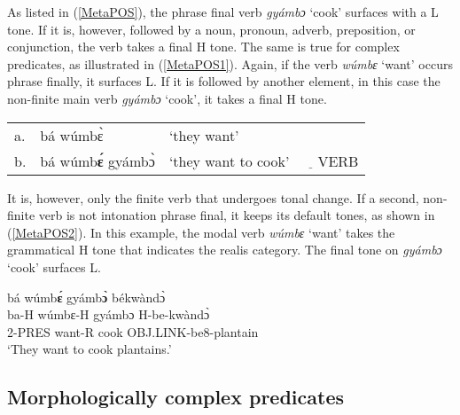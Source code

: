 \noindent As listed in (\ref{MetaPOS}), the phrase final verb {\itshape gyámbɔ} `cook' surfaces with a L tone. If it is, however, followed by a noun, pronoun, adverb, preposition, or conjunction, the verb takes a final H tone. The same is true for complex predicates, as illustrated in (\ref{MetaPOS1}). Again, if the verb {\itshape wúmbɛ} `want' occurs phrase finally, it surfaces L. If it is followed by another element, in this case the non-finite main verb {\itshape gyámbɔ} `cook', it takes a final H tone.

\begin{exe}
\ex\label{MetaPOS1}
\begin{tabular}{llll}
a. & bá wúmbɛ̀ &  `they want'  & \\
b. &  bá wúmb{\bfseries ɛ́} gyámbɔ̀ &  `they want to cook' &  $\underline{\quad}$VERB \\
\end{tabular}
\end{exe}

It is, however, only the finite verb that undergoes tonal change. If a second, non-finite verb is not intonation phrase final, it keeps its default tones, as shown in (\ref{MetaPOS2}). In this example, the modal verb {\itshape wúmbɛ} `want' takes the grammatical H tone that indicates the realis category. The final tone on {\itshape gyámbɔ} `cook' surfaces L.


\begin{exe} 
\ex\label{MetaPOS2}
  \glll     bá wúmb{\bfseries ɛ́} gyámb{\bfseries ɔ̀} békwàndɔ̀\\
             ba-H wúmbɛ-H gyámbɔ H-be-kwàndɔ̀ \\
              2-PRES want-R cook OBJ.LINK-be8-plantain   \\
    \trans `They want to cook plantains.'
\end{exe}


















\subsection{Morphologically complex predicates}
\label{sec:MorphSimp}

